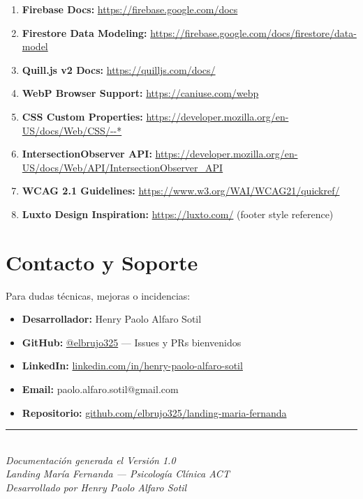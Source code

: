 \documentclass[12pt,a4paper,spanish]{report}
\begin{document}
\begin{enumerate}
    \item \textbf{Firebase Docs:} \url{https://firebase.google.com/docs}
    \item \textbf{Firestore Data Modeling:} \url{https://firebase.google.com/docs/firestore/data-model}
    \item \textbf{Quill.js v2 Docs:} \url{https://quilljs.com/docs/}
    \item \textbf{WebP Browser Support:} \url{https://caniuse.com/webp}
    \item \textbf{CSS Custom Properties:} \url{https://developer.mozilla.org/en-US/docs/Web/CSS/--*}
    \item \textbf{IntersectionObserver API:} \url{https://developer.mozilla.org/en-US/docs/Web/API/IntersectionObserver_API}
    \item \textbf{WCAG 2.1 Guidelines:} \url{https://www.w3.org/WAI/WCAG21/quickref/}
    \item \textbf{Luxto Design Inspiration:} \url{https://luxto.com/} (footer style reference)
\end{enumerate}

\section{Contacto y Soporte}

Para dudas técnicas, mejoras o incidencias:

\begin{itemize}
    \item \textbf{Desarrollador:} Henry Paolo Alfaro Sotil
    \item \textbf{GitHub:} \href{https://github.com/elbrujo325}{@elbrujo325} — Issues y PRs bienvenidos
    \item \textbf{LinkedIn:} \href{https://linkedin.com/in/henry-paolo-alfaro-sotil}{linkedin.com/in/henry-paolo-alfaro-sotil}
    \item \textbf{Email:} paolo.alfaro.sotil@gmail.com
    \item \textbf{Repositorio:} \href{https://github.com/elbrujo325/landing-maria-fernanda}{github.com/elbrujo325/landing-maria-fernanda}
\end{itemize}

\vspace{2cm}

\begin{center}
    \rule{0.5\textwidth}{0.5pt}\\
    \vspace{0.5cm}
    \textit{Documentación generada el \DTMtoday \quad Versión 1.0}\\
    \textit{Landing María Fernanda — Psicología Clínica ACT}\\
    \textit{Desarrollado por Henry Paolo Alfaro Sotil}
\end{center}
\end{document}
